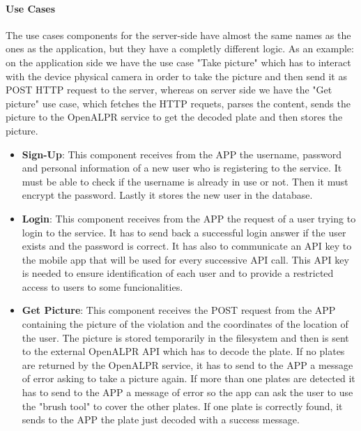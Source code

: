 \paragraph{Use Cases}
The use cases components for the server-side have almost the same names as the ones as the application, but they have a completly different logic.
As an example: on the application side we have the use case "Take picture" which has to interact with the device physical camera in order to take the picture and then send it as POST HTTP request to the server, whereas on server side we have the "Get picture" use case, which fetches the HTTP requets, parses the content, sends the picture to the OpenALPR service to get the decoded plate and then stores the picture.
\begin{itemize}
  \item \textbf{Sign-Up}: This component receives from the APP the username, password and personal information of a new user who is registering to the service. It must be able to check if the username is already in use or not. Then it must encrypt the password. Lastly it stores the new user in the database.
  \item \textbf{Login}: This component receives from the APP the request of a user trying to login to the service. It has to send back a successful login answer if the user exists and the password is correct. It has also to communicate an API key to the mobile app that will be used for every successive API call. This API key is needed to ensure identification of each user and to provide a restricted access to users to some funcionalities.
  \item \textbf{Get Picture}: This component receives the POST request from the APP containing the picture of the violation and the coordinates of the location of the user. The picture is stored temporarily in the filesystem and then is sent to the external OpenALPR API which has to decode the plate. If no plates are returned by the OpenALPR service, it has to send to the APP a message of error asking to take a picture again. If more than one plates are detected it has to send to the APP a message of error so the app can ask the user to use the "brush tool" to cover the other plates. If one plate is correctly found, it sends to the APP the plate just decoded with a success message.


\end{itemize}
